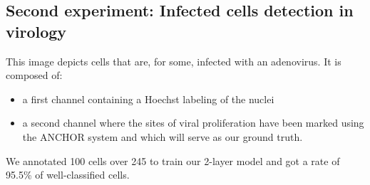 \documentclass{article}
\begin{document}
\subsection{Second experiment: Infected cells detection in virology}

This image depicts cells that are, for some, infected with an adenovirus. It is composed of:
\begin{itemize}
  \item a first channel containing a Hoechst labeling of the nuclei
  \item a second channel where the sites of viral proliferation have been marked using the ANCHOR system and which will serve as our ground truth.
\end{itemize}
We annotated 100 cells over 245 to train our 2-layer model and got a rate of 95.5\% of well-classified cells.    
\end{document}
